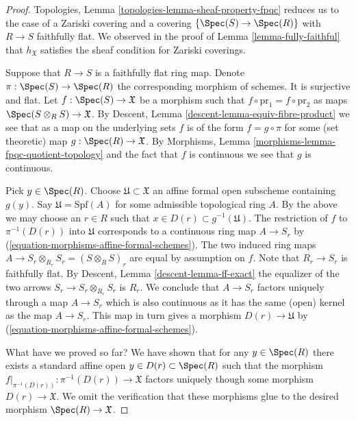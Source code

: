 \begin{proof}
Topologies, Lemma \ref{topologies-lemma-sheaf-property-fpqc}
reduces us to the case of a Zariski covering and a covering
$\{\Spec(S) \to \Spec(R)\}$ with $R \to S$ faithfully flat.
We observed in the proof of Lemma \ref{lemma-fully-faithful} 
that $h_\mathfrak X$ satisfies the sheaf condition for Zariski coverings.

\medskip\noindent
Suppose that $R \to S$ is a faithfully flat ring map.
Denote $\pi : \Spec(S) \to \Spec(R)$ the
corresponding morphism of schemes. It is surjective and flat.
Let $f : \Spec(S) \to \mathfrak X$ be a morphism
such that $f \circ \text{pr}_1 = f \circ \text{pr}_2$
as maps $\Spec(S \otimes_R S) \to \mathfrak X$.
By Descent, Lemma \ref{descent-lemma-equiv-fibre-product}
we see that as a map on the underlying
sets $f$ is of the form $f = g \circ \pi$ for some
(set theoretic) map $g : \Spec(R) \to \mathfrak X$.
By Morphisms, Lemma \ref{morphisms-lemma-fpqc-quotient-topology}
and the fact that $f$ is continuous we see that $g$
is continuous.

\medskip\noindent
Pick $y \in \Spec(R)$. Choose $\mathfrak U \subset \mathfrak X$
an affine formal open subscheme containing $g(y)$.
Say $\mathfrak U = \text{Spf}(A)$ for some admissible topological
ring $A$. By the above we may choose an $r \in R$ such that
$x \in D(r) \subset g^{-1}(\mathfrak U)$.
The restriction of $f$ to $\pi^{-1}(D(r))$ into $\mathfrak U$
corresponds to a continuous ring map $A \to S_r$ by
(\ref{equation-morphisms-affine-formal-schemes}). The two induced ring maps
$A \to S_r \otimes_{R_r} S_r = (S \otimes_R S)_r$ are equal
by assumption on $f$.
Note that $R_r \to S_r$ is faithfully flat.
By Descent, Lemma \ref{descent-lemma-ff-exact} the equalizer of
the two arrows $S_r \to S_r \otimes_{R_r} S_r$ is $R_r$.
We conclude that $A \to S_r$ factors uniquely through a map $A \to S_r$
which is also continuous as it has the same (open) kernel as the
map $A \to S_r$. This map in turn gives a morphism $D(r) \to \mathfrak U$ by
(\ref{equation-morphisms-affine-formal-schemes}).

\medskip\noindent
What have we proved so far? We have shown that for any $y \in \Spec(R)$
there exists a standard affine open
$y \in D(r) \subset \Spec(R)$ such that the morphism
$f|_{\pi^{-1}(D(r))} : \pi^{-1}(D(r)) \to \mathfrak X$ factors uniquely
though some morphism $D(r) \to \mathfrak X$. We omit the
verification that these morphisms glue to the desired
morphism $\Spec(R) \to \mathfrak X$.
\end{proof}


